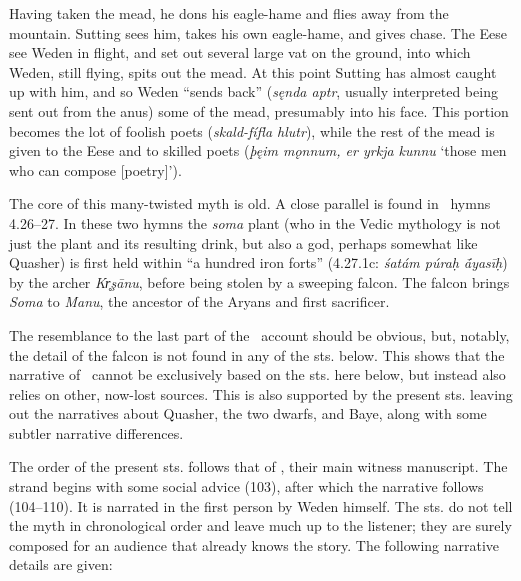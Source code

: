 Having taken the mead, he dons his eagle-hame and flies away from the mountain. Sutting sees him, takes his own eagle-hame, and gives chase. The Eese see Weden in flight, and set out several large vat on the ground, into which Weden, still flying, spits out the mead. At this point Sutting has almost caught up with him, and so Weden “sends back” (\emph{sęnda aptr}, usually interpreted being sent out from the anus) some of the mead, presumably into his face. This portion becomes the lot of foolish poets (\emph{skald-fífla hlutr}), while the rest of the mead is given to the Eese and to skilled poets (\emph{þęim mǫnnum, er yrkja kunnu} ‘those men who can compose [poetry]’).

The core of this many-twisted myth is old. A close parallel is found in \Rigveda\ hymns 4.26–27. In these two hymns the \emph{soma} plant (who in the Vedic mythology is not just the plant and its resulting drink, but also a god, perhaps somewhat like Quasher) is first held within “a hundred iron forts” (4.27.1c: \emph{śatám púraḥ ā́yasīḥ}) by the archer \emph{Kr̥şānu}, before being stolen by a sweeping falcon. The falcon brings \emph{Soma} to \emph{Manu}, the ancestor of the Aryans and first sacrificer.

The resemblance to the last part of the \Skaldskaparmal\ account should be obvious, but, notably, the detail of the falcon is not found in any of the sts. below. This shows that the narrative of \Skaldskaparmal\ cannot be exclusively based on the sts. here below, but instead also relies on other, now-lost sources. This is also supported by the present sts. leaving out the narratives about Quasher, the two dwarfs, and Baye, along with some subtler narrative differences.

The order of the present sts. follows that of \Regius, their main witness manuscript. The strand begins with some social advice (103), after which the narrative follows (104–110). It is narrated in the first person by Weden himself. The sts. do not tell the myth in chronological order and leave much up to the listener; they are surely composed for an audience that already knows the story. The following narrative details are given:

